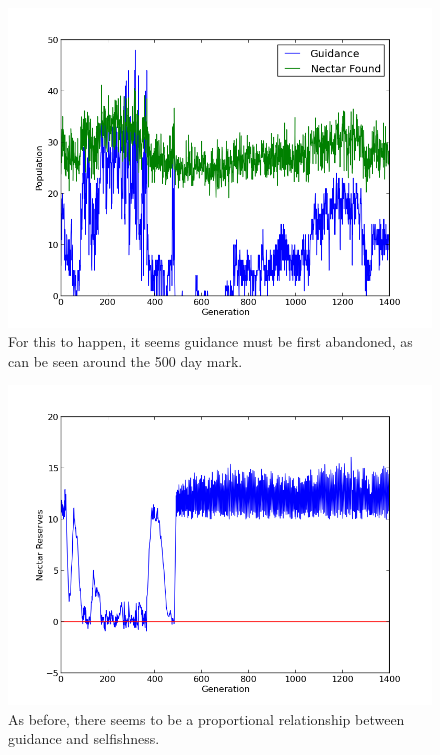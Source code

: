 \documentclass[11pt, letter]{article}
\begin{document}
                        \begin{figure}[tbph!]
				\begin{center}
					\includegraphics[scale=.5]{results/gossip_alt_tell.png}
				\end{center}
                \caption{For this to happen, it seems guidance must be first abandoned, as can be seen around the 500 day mark.}
				\label{fig:altruistic_guidance}
			\end{figure}

			\begin{figure}[tbph!]
				\begin{center}
					\includegraphics[scale=.5]{results/gossip_alt_res.png}
				\end{center}
                \caption{As before, there seems to be a proportional relationship between guidance and selfishness.}
				\label{fig:altruistic_reserves}
			\end{figure}
\end{document}
